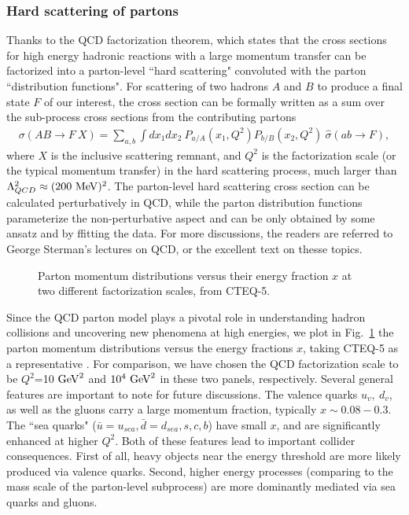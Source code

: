 \documentclass[12pt,prd,aps,floats,preprintnumbers,preprint,superscriptaddress,floatfix,nofootinbib]{revtex4}
\def\mev{{\rm MeV}}
\def\gev{{\rm GeV}}
\def\bea{\begin{eqnarray}}
\def\eea{\end{eqnarray}}
\begin{document}
\subsubsection{Hard scattering of partons}
Thanks to the QCD factorization theorem,  which states that 
the cross sections for  high energy hadronic reactions with a large
momentum transfer can be factorized into a parton-level ``hard scattering"
convoluted with the parton ``distribution functions". 
For scattering of two hadrons $A$ and $B$ to produce a final state
$F$ of our interest, 
the cross section can be  formally written  as a sum over
the sub-process cross sections from the contributing partons
\bea
\sigma(AB\to F\ X) = \sum_{a,b} \int dx_1 dx_2\  P_{a/A}(x_1,Q^2)  P_{b/B}(x_2,Q^2)
\  \hat\sigma(ab \to F),
\label{eq:ab}
\eea
where $X$ is the inclusive scattering remnant, and 
$Q^2$ is the factorization scale (or the typical momentum transfer) 
in the hard scattering process, much  larger than 
$\Lambda_{QCD}^2\approx (200\  \mev)^2$.
The parton-level hard scattering cross section can be calculated 
perturbatively in QCD, while the parton distribution  functions 
parameterize the non-perturbative aspect and can be only
obtained by some ansatz and by ffitting the data. For more discussions,
the readers are referred to George Sterman's lectures \cite{george} on
QCD,  or the excellent text \cite{esw} on thesse topics.

\begin{center}
\begin{figure}[tb]
\caption{Parton momentum distributions versus their energy fraction $x$ at two
different factorization scales, from CTEQ-5. }
\label{fig:pdfs}
\end{figure}
\end{center}
 
Since the QCD parton model plays a pivotal role in understanding
hadron collisions and uncovering new phenomena at high energies,
we plot in Fig.~\ref{fig:pdfs} the parton momentum distributions 
versus the energy fractions $x$, taking CTEQ-5 as a 
representative \cite{cteq5}. 
For comparison, we have chosen the QCD factorization scale to be 
$Q^2$=10 $\gev^2$ and $10^4\ \gev^2$ in these two panels,
respectively.  Several general features are important
to note for future discussions. The valence quarks $u_v,\ d_v$,
as well as the gluons carry a large momentum fraction, typically
$x\sim 0.08 - 0.3$. The ``sea quarks" ($\bar u=u_{sea},
\bar d=d_{sea}, s,c,b$) have
small $x$, and are significantly enhanced at higher $Q^2$. Both
of these features lead to important collider consequences. First of
all, heavy objects near the energy threshold are more likely produced
via valence quarks. Second, higher energy processes (comparing to
the mass scale of the parton-level subprocess) are more dominantly
mediated via sea quarks and gluons.
\end{document}

